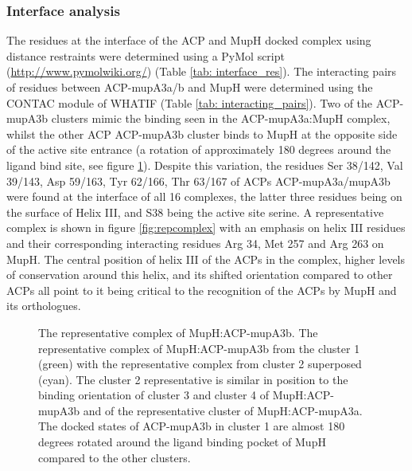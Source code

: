 		\subsubsection{Interface analysis}
		\label{sec:InterfaceAnalysis}
		The residues at the interface of the ACP and MupH docked complex using distance restraints were determined using a PyMol script (\url{http://www.pymolwiki.org/}) (Table \ref{tab: interface_res}). The interacting pairs of residues between ACP-mupA3a/b and MupH were determined using the CONTAC module of WHATIF \parencite{Vriend1990} (Table \ref{tab: interacting_pairs}). Two of the ACP-mupA3b clusters mimic the binding seen in the ACP-mupA3a:MupH complex, whilst the other ACP ACP-mupA3b cluster binds to MupH at the opposite side of the active site entrance (a rotation of approximately 180 degrees around the ligand bind site, see figure \ref{fig:180opps}). Despite this variation, the residues Ser 38/142, Val 39/143, Asp 59/163, Tyr 62/166, Thr 63/167 of ACPs ACP-mupA3a/mupA3b were found at the interface of all 16 complexes, the latter three residues being on the surface of Helix III, and S38 being the active site serine. A representative complex is shown in figure \ref{fig:repcomplex} with an emphasis on helix III residues and their corresponding interacting residues Arg 34, Met 257 and Arg 263 on MupH. The central position of helix III of the ACPs in the complex, higher levels of conservation around this helix, and its shifted orientation compared to other ACPs all point to it being critical to the recognition of the ACPs by MupH and its orthologues.
		
			\setlength\fboxsep{5pt}
			\setlength\fboxrule{1.5pt}
			\begin{figure} [h!]
			\centering
			\caption[The representative complex of MupH:ACP-mupA3b.]{The representative complex of MupH:ACP-mupA3b. The representative complex of MupH:ACP-mupA3b from the cluster 1 (green) with the representative complex from cluster 2 superposed (cyan). The cluster 2 representative is similar in position to the binding orientation of cluster 3 and cluster 4 of MupH:ACP-mupA3b and of the representative cluster of MupH:ACP-mupA3a. The docked states of ACP-mupA3b in cluster 1 are almost 180 degrees rotated around the ligand binding pocket of MupH compared to the other clusters.}
			\label{fig:180opps}
			\end{figure}				
			
